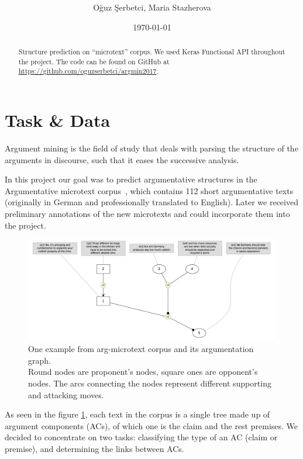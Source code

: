 \documentclass[onecolumn]{article}
\title{\spacecaps{Project module report: Argumentation Mining }\\ \normalsize \spacesc{University of Potsdam, Winter semester 2017/18} }
\author{Oğuz Şerbetci, Maria Stazherova}
\date{\today}
\begin{document}
\maketitle

\begin{abstract}

Structure prediction on ``microtext'' corpus. We used Keras Functional API throughout the project. The code can be found on GitHub at \url{https://github.com/oguzserbetci/argmin2017}.

\end{abstract}


\section{Task \& Data}
Argument mining is the field of study that deals with parsing the structure of the arguments in discourse, such that it eases the successive analysis.

In this project our goal was to predict argumentative structures in the
Argumentative microtext corpus~\cite{peldszus2015annotated}, which contains 112 short argumentative texts
(originally in German and professionally translated to English). Later we received preliminary annotations of the new microtexts
and could incorporate them into the project.

\begin{figure}[h]
    \centering
    \includegraphics[width=0.8\linewidth]{fig/microtext.jpg}
    \caption{One example from arg-microtext corpus and its argumentation graph.
            \\Round nodes are proponent's nodes, square ones are opponent's nodes. The arcs connecting the nodes represent different supporting and attacking moves.}
    \label{fig:microtext}
        \end{figure}

As seen in the figure \ref{fig:microtext}, each text in the corpus is a single tree made up of argument components (ACs), of which one is the claim and the rest premises.
We decided to concentrate on two tasks: classifying the type of an AC (claim or premise), and determining the links between ACs.
\end{document}
